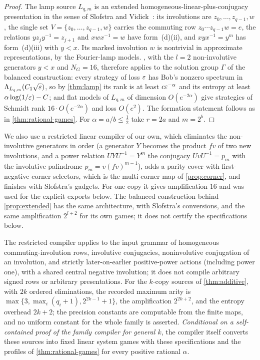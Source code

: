 \begin{proof}
The lamp source $L_{q,m}$ is an extended homogeneous-linear-plus-conjugacy presentation in the sense of Slofstra and
Vidick~\cite[\S6, (a)--(d)]{SV18}: its involutions are $z_0,\dots,z_{q-1},w$, the single set $V=\{z_0,\dots,z_{q-1},w\}$ carries
the commuting row $z_0\cdots z_{q-1}w=e$, the relations $yz_jy^{-1}=z_{j+1}$ and $xwx^{-1}=w$ have form~(d)(ii), and
$xyx^{-1}=y^m$ has form~(d)(iii) with $y<x$. Its marked involution $w$ is nontrivial in approximate representations, by the
Fourier-lamp models. , with the $l=2$ non-involutive generators $y<x$ and $N_G=16$, therefore applies to the solution
group $\Gamma$ of the balanced construction: every strategy of loss $\varepsilon$ has Bob's nonzero spectrum in $\Lambda_{L_{q,m}}(C_1\sqrt{\varepsilon})$,
so by \cref{thm:lamp} its rank is at least $c\varepsilon^{-\alpha}$ and its entropy at least $\alpha\log(1/\varepsilon)-C$; and flat models of $L_{q,m}$ of
dimension $O(e^{-2\alpha})$ give strategies of Schmidt rank $16\cdot O(e^{-2\alpha})$ and loss $O(e^2)$. The formation statement follows as in
\cref{thm:rational-games}. For $\alpha=a/b\le\frac12$ take $r=2a$ and $m=2^b$.
\end{proof}

We also use a restricted linear compiler of our own, which eliminates the non-involutive generators in order (a generator $Y$ becomes the product $fv$ of two new involutions, and a power relation $UYU^{-1}=Y^m$ the
conjugacy $UvU^{-1}=p_m$ with the involutive palindrome $p_m=v(fv)^{m-1}$), adds a parity cover with first-negative corner
selectors, which is the multi-corner map of \cref{prop:corner}, and finishes with Slofstra's gadgets. For one copy it gives
amplification $16$ and was used for the explicit exports below. The balanced construction behind \cref{prop:extended} has the same
architecture, with Slofstra's conversions, and the same amplification $2^{l+2}$ for its own games; it does not certify the
specifications below.

\begin{theorem}\label{thm:rational-linear-k}
The restricted compiler applies to the input grammar of homogeneous commuting-involution rows, involutive conjugacies,
noninvolutive conjugation of an involution, and strictly later-on-earlier positive-power actions (including power one), with a
shared central negative involution; it does not compile arbitrary signed rows or arbitrary presentations. For the $k$-copy
sources of \cref{thm:additive}, with $2k$ ordered eliminations, the recorded maximum arity is
$\max\{3,\max_i(q_i+1),2^{2k-1}+1\}$, the amplification $2^{2k+2}$, and the entropy overhead $2k+2$; the precision constants are
computable from the finite maps, and no uniform constant for the whole family is asserted. \emph{Conditional on a
self-contained proof of the family compiler for general $k$}, the compiler itself converts these sources into fixed linear
system games with these specifications and the profiles of \cref{thm:rational-games} for every positive rational $\alpha$.
\end{theorem}

